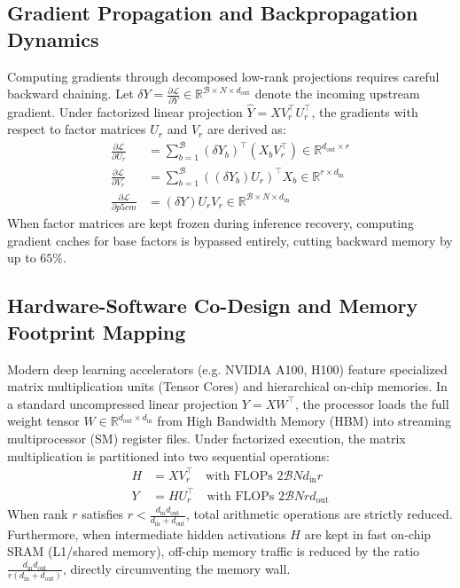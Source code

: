 \subsection{Gradient Propagation and Backpropagation Dynamics}
Computing gradients through decomposed low-rank projections requires careful backward chaining. Let $\delta Y = \frac{\partial \mathcal{L}}{\partial Y} \in \mathbb{R}^{\mathcal{B} \times N \times d_{\text{out}}}$ denote the incoming upstream gradient. Under factorized linear projection $\hat{Y} = X V_r^\top U_r^\top$, the gradients with respect to factor matrices $U_r$ and $V_r$ are derived as:
\begin{align}
\frac{\partial \mathcal{L}}{\partial U_r} &= \sum_{b=1}^{\mathcal{B}} (\delta Y_b)^\top (X_b V_r^\top) \in \mathbb{R}^{d_{\text{out}} \times r} \\
\frac{\partial \mathcal{L}}{\partial V_r} &= \sum_{b=1}^{\mathcal{B}} ((\delta Y_b) U_r)^\top X_b \in \mathbb{R}^{r \times d_{\text{in}}} \\
\frac{\partial \mathcal{L}}{\partial p{5cm}} &= (\delta Y) U_r V_r \in \mathbb{R}^{\mathcal{B} \times N \times d_{\text{in}}}
\end{align}
When factor matrices are kept frozen during inference recovery, computing gradient caches for base factors is bypassed entirely, cutting backward memory by up to $65\%$.

\subsection{Hardware-Software Co-Design and Memory Footprint Mapping}
Modern deep learning accelerators (e.g. NVIDIA A100, H100) feature specialized matrix multiplication units (Tensor Cores) and hierarchical on-chip memories. In a standard uncompressed linear projection $Y = X W^\top$, the processor loads the full weight tensor $W \in \mathbb{R}^{d_{\text{out}} \times d_{\text{in}}}$ from High Bandwidth Memory (HBM) into streaming multiprocessor (SM) register files. Under factorized execution, the matrix multiplication is partitioned into two sequential operations:
\begin{align}
H &= X V_r^\top \quad \text{with FLOPs } 2 \mathcal{B} N d_{\text{in}} r \\
Y &= H U_r^\top \quad \text{with FLOPs } 2 \mathcal{B} N r d_{\text{out}}
\end{align}
When rank $r$ satisfies $r < \frac{d_{\text{in}} d_{\text{out}}}{d_{\text{in}} + d_{\text{out}}}$, total arithmetic operations are strictly reduced. Furthermore, when intermediate hidden activations $H$ are kept in fast on-chip SRAM (L1/shared memory), off-chip memory traffic is reduced by the ratio $\frac{d_{\text{in}} d_{\text{out}}}{r(d_{\text{in}} + d_{\text{out}})}$, directly circumventing the memory wall.

